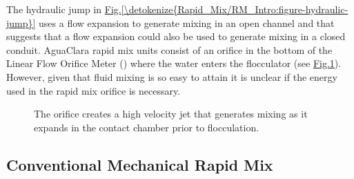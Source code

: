 \documentclass[letterpaper,10pt,english]{sphinxmanual}
\let\sphinxpxdimen\pdfpxdimen\else\newdimen\sphinxpxdimen
\begin{document}
The hydraulic jump in \hyperref[\detokenize{Rapid_Mix/RM_Intro:figure-hydraulic-jump}]{Fig.\@ \ref{\detokenize{Rapid_Mix/RM_Intro:figure-hydraulic-jump}}} uses a flow expansion to generate mixing in an open channel and that suggests that a flow expansion could also be used to generate mixing in a closed conduit. AguaClara rapid mix units consist of an orifice in the bottom of the Linear Flow Orifice Meter ({\hyperref[\detokenize{Flow_Control_and_Measurement/FCM_Design:heading-lfom}]{}}) where the water enters the flocculator (see \hyperref[\detokenize{Rapid_Mix/RM_Intro:figure-rapid-mix-orifice}]{Fig.\@ \ref{\detokenize{Rapid_Mix/RM_Intro:figure-rapid-mix-orifice}}}). However, given that fluid mixing is so easy to attain it is unclear if the energy used in the rapid mix orifice is necessary.

\begin{figure}[htbp]
\centering
\capstart

\noindent\sphinxincludegraphics[width=400\sphinxpxdimen]{{Rapid_mix_orifice}.png}
\caption{The orifice creates a high velocity jet that generates mixing as it expands in the contact chamber prior to flocculation.}\label{\detokenize{Rapid_Mix/RM_Intro:id8}}\label{\detokenize{Rapid_Mix/RM_Intro:figure-rapid-mix-orifice}}\end{figure}


\subsection{Conventional Mechanical Rapid Mix}
\label{\detokenize{Rapid_Mix/RM_Intro:conventional-mechanical-rapid-mix}}\label{\detokenize{Rapid_Mix/RM_Intro:heading-conventional-mechanical-rapid-mix}}
\end{document}
